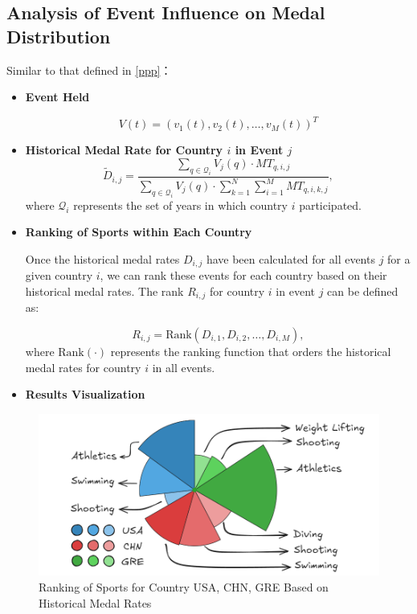 \documentclass{mcmthesis}
\begin{document}
\subsection{Analysis of Event Influence on Medal Distribution}
\label{meigui}
Similar to that defined in \ref{ppp}：
\begin{itemize}[leftmargin=0.15in, labelsep=0.1in, itemsep=1pt, parsep=0pt]
	\item \textbf{Event Held}
	
	\[
	V(t) = \left( v_1(t), v_2(t), \dots, v_M(t) \right)^T
	\]
	

	
	\item \textbf{Historical Medal Rate for Country \( i \) in Event \( j \)}
	\[
	\tilde{D}_{i,j} = \frac{\sum_{q \in \mathcal{Q}_i} V_j(q) \cdot MT_{q,i,j}}{\sum_{q \in \mathcal{Q}_i} V_j(q) \cdot \sum_{k=1}^{N} \sum_{i=1}^{M} MT_{q,i,k,j}},
	\]
	where \( \mathcal{Q}_i \) represents the set of years in which country \( i \) participated.


	
	\item \textbf{Ranking of Sports within Each Country}
	
	Once the historical medal rates \( D_{i,j} \) have been calculated for all events \( j \) for a given country \( i \), we can rank these events for each country based on their historical medal rates. The rank \( R_{i,j} \) for country \( i \) in event \( j \) can be defined as:
	
	\[
	R_{i,j} = \text{Rank}(D_{i,1}, D_{i,2}, \dots, D_{i,M}),
	\]
	where \( \text{Rank}(\cdot) \) represents the ranking function that orders the historical medal rates for country \( i \) in all events.
	
	\item \textbf{Results Visualization}
	

\end{itemize}
	\begin{figure}[htbp]
		\centering
		\includegraphics[width=1\textwidth]{fig/Rose-Chart.png}
		\caption{Ranking of Sports for Country USA, CHN, GRE Based on Historical Medal Rates}
		\label{fig:ranking}
	\end{figure}
\end{document}
